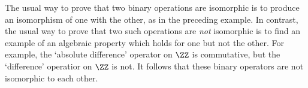 \V

        The usual way to prove that two binary operations are isomorphic is to produce an isomorphism of one with the other, as in the preceding example.
    In contrast, the usual way to prove that two such operations are {\em not} isomorphic
    is to find an example of an algebraic property which holds for one but not the other.
    For example, the `absolute difference' operator on ${\ZZ}$ is commutative, but the `difference' operatior on ${\ZZ}$ is not.
    It follows that these binary operators are not isomorphic to each other.









